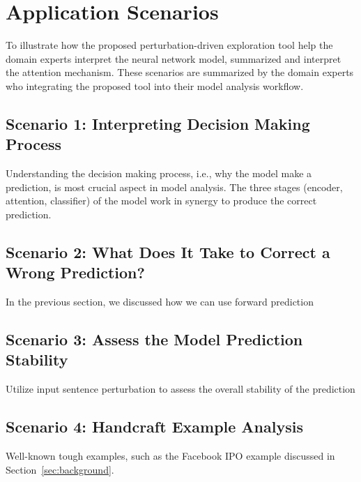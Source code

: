 \section{Application Scenarios}
\label{sec:caseStudy}
To illustrate how the proposed perturbation-driven exploration tool help the domain experts interpret the neural network model,
summarized  and interpret the attention mechanism.
These scenarios are summarized by the domain experts who integrating the proposed tool into their model analysis workflow.

\subsection{Scenario 1: Interpreting Decision Making Process}
Understanding the decision making process, i.e., why the model make a prediction, is most crucial aspect in model analysis.
The three stages (encoder, attention, classifier) of the model work in synergy to produce the correct prediction.
%

\subsection{Scenario 2: What Does It Take to Correct a Wrong Prediction?}
In the previous section, we discussed how we can use forward prediction

\subsection{Scenario 3: Assess the Model Prediction Stability}
Utilize input sentence perturbation to assess the overall stability of the prediction

\subsection{Scenario 4: Handcraft Example Analysis}
Well-known tough examples, such as the Facebook IPO example discussed in Section~\ref{sec:background}.

